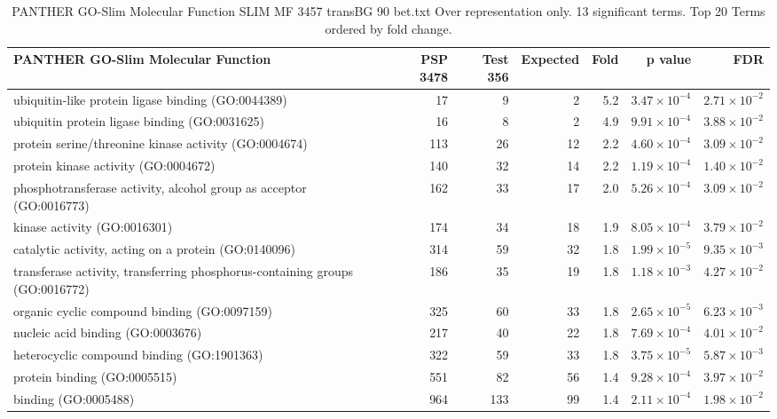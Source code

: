\begin{table}[ht]
\centering
\begin{adjustbox}{width=\textwidth}
\begin{tabular}{lrrrrrr}
  \hline
PANTHER GO-Slim Molecular Function & PSP 3478 & Test 356 & Expected & Fold & p value & FDR \\ 
  \hline
ubiquitin-like protein ligase binding (GO:0044389) & 17 & 9 & 2 & 5.2 & $3.47 \times 10^{-4}$ & $2.71 \times 10^{-2}$ \\ 
  ubiquitin protein ligase binding (GO:0031625) & 16 & 8 & 2 & 4.9 & $9.91 \times 10^{-4}$ & $3.88 \times 10^{-2}$ \\ 
  protein serine/threonine kinase activity (GO:0004674) & 113 & 26 & 12 & 2.2 & $4.60 \times 10^{-4}$ & $3.09 \times 10^{-2}$ \\ 
  protein kinase activity (GO:0004672) & 140 & 32 & 14 & 2.2 & $1.19 \times 10^{-4}$ & $1.40 \times 10^{-2}$ \\ 
  phosphotransferase activity, alcohol group as acceptor (GO:0016773) & 162 & 33 & 17 & 2.0 & $5.26 \times 10^{-4}$ & $3.09 \times 10^{-2}$ \\ 
  kinase activity (GO:0016301) & 174 & 34 & 18 & 1.9 & $8.05 \times 10^{-4}$ & $3.79 \times 10^{-2}$ \\ 
  catalytic activity, acting on a protein (GO:0140096) & 314 & 59 & 32 & 1.8 & $1.99 \times 10^{-5}$ & $9.35 \times 10^{-3}$ \\ 
  transferase activity, transferring phosphorus-containing groups (GO:0016772) & 186 & 35 & 19 & 1.8 & $1.18 \times 10^{-3}$ & $4.27 \times 10^{-2}$ \\ 
  organic cyclic compound binding (GO:0097159) & 325 & 60 & 33 & 1.8 & $2.65 \times 10^{-5}$ & $6.23 \times 10^{-3}$ \\ 
  nucleic acid binding (GO:0003676) & 217 & 40 & 22 & 1.8 & $7.69 \times 10^{-4}$ & $4.01 \times 10^{-2}$ \\ 
  heterocyclic compound binding (GO:1901363) & 322 & 59 & 33 & 1.8 & $3.75 \times 10^{-5}$ & $5.87 \times 10^{-3}$ \\ 
  protein binding (GO:0005515) & 551 & 82 & 56 & 1.4 & $9.28 \times 10^{-4}$ & $3.97 \times 10^{-2}$ \\ 
  binding (GO:0005488) & 964 & 133 & 99 & 1.4 & $2.11 \times 10^{-4}$ & $1.98 \times 10^{-2}$ \\ 
   \hline
\end{tabular}
\end{adjustbox}
\caption{PANTHER GO-Slim Molecular Function SLIM MF 3457 transBG 90 bet.txt Over representation only. 13 significant terms. Top 20 Terms ordered by fold change. } 
\label{tab:PANTHER GO-Slim Molecular Function SLIM MF 3457 transBG 90 bet.txt Over representation only. 13 significant terms. Top 20 Terms ordered by fold change. }
\end{table}


